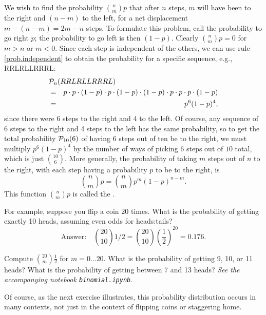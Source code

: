 We wish to find the probability $\binom{n}{m}{p}$ that after $n$ steps, $m$ will have been to the right and $(n-m)$ to the left, for a net displacement $m-(n-m) = 2m-n$ steps.
To formulate this problem, call the probability to go right $p$; the probability to go left is then $(1-p)$.
Clearly $\binom{n}{m}{p} = 0$ for $m>n$ or $m<0$. Since each step is independent of the others, we can use rule \ref{prob.independent} to obtain the probability for a specific sequence, e.g., RRLRLLRRRL:
\begin{eqnarray}
	\lefteqn{\prob_{n}(RRLRLLRRRL) } \nonumber\\
	&=& p\cdot p\cdot(1-p)\cdot p\cdot(1-p)\cdot(1-p)\cdot p\cdot p\cdot p\cdot(1-p) \nonumber\\
	&=& p^{6}(1-p)^{4}
\label{e.one-sequence},
\end{eqnarray}
since there were 6 steps to the right and 4 to the left. Of course, any sequence of 6 steps to the right and 4 steps to the left has the same probability, so to get the total probability $\mathcal{P}_{10}(6)$ of having 6 steps out of ten be to the right, we must multiply $p^{6}(1-p)^{4}$ by the number of ways of picking $6$ steps out of $10$ total, which is just $10\choose6$.  More generally, the probability of taking $m$ steps out of $n$ to the right, with each step having a probability $p$ to be to the right, is
\begin{equation}\label{e.binomial}
	\binom{n}{m}{p} = {n\choose m} p^{m}(1-p)^{n-m}.
\end{equation}
This function $\binom{n}{m}{p}$ is called the .

For example, suppose you flip a coin 20 times.  What is the probability of getting exactly 10 heads, assuming even odds for heads:tails?
\[
	\textrm{Answer:}\quad\binom{20}{10}{1/2} = {20\choose10} \left(\frac{1}{2}\right)^{20} = 0.176.
\]
\begin{exercisebox}
\label{e.prob-distribution}
Compute $\binom{20}{m}{\frac{1}{2}}$ for $m = 0\ldots20$.  What is the probability of getting 9, 10, or 11 heads?  What is the probability of getting between 7 and 13 heads? \emph{See the accompanying notebook \texttt{binomial.ipynb}.}
\end{exercisebox}

Of course, as the next exercise illustrates, this probability distribution occurs in many contexts, not just in the context of flipping coins or staggering home.

